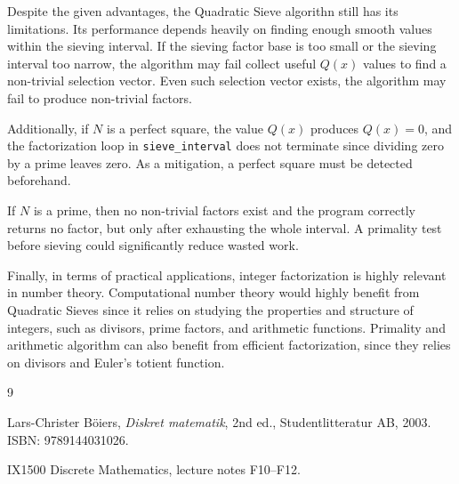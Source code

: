 \documentclass[11pt,a4paper]{article}
\begin{document}
Despite the given advantages, the Quadratic Sieve algorithn still has its limitations. Its performance depends heavily on finding enough smooth values within the sieving interval. If the sieving factor base is too small or the sieving interval too narrow, the algorithm may fail collect useful $Q(x)$ values to find a non-trivial selection vector. Even such selection vector exists, the algorithm may fail to produce non-trivial factors.

Additionally, if $N$ is a perfect square, the value $Q(x)$ produces $Q(x)=0$, and the factorization loop in \texttt{sieve\_interval} does not terminate since dividing zero by a prime leaves zero. As a mitigation, a perfect square must be detected beforehand.

If $N$ is a prime, then no non-trivial factors exist and the program correctly returns no factor, but only after exhausting the whole interval. A primality test before sieving could significantly reduce wasted work.

Finally, in terms of practical applications, integer factorization is highly relevant in number theory. Computational number theory would highly benefit from Quadratic Sieves since it relies on studying the properties and structure of integers, such as divisors, prime factors, and arithmetic functions. Primality and arithmetic algorithm can also benefit from efficient factorization, since they relies on divisors and Euler's totient function.

\begin{thebibliography}{9}

Lars-Christer Böiers,
\textit{Diskret matematik},
2nd ed.,
Studentlitteratur AB, 2003.
ISBN: 9789144031026.

IX1500 Discrete Mathematics, lecture notes F10--F12.

\end{thebibliography}
\end{document}
